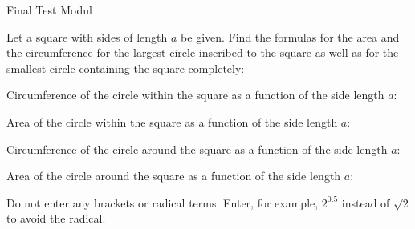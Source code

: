 \begin{MTest}{Final Test Modul }
\begin{MExercise}
Let a square with sides of length $a$ be given. Find the formulas for the area and the circumference
for the largest circle inscribed to the square as well as for the smallest circle containing the 
square completely:
\begin{MExerciseItems}
\item{Circumference of the circle within the square as a function of the side length $a$: }
%
\item{Area of the circle within the square as a function of the side length $a$: }
%
\item{Circumference of the circle around the square as a function of the side length $a$: }
%
\item{Area of the circle around the square as a function of the side length $a$: }
\end{MExerciseItems}
\par

Do not enter any brackets or radical terms. Enter, for example, $2^{0.5}$ instead of $\sqrt{2}$
to avoid the radical.
\end{MExercise}

\end{MTest}

\printindex

